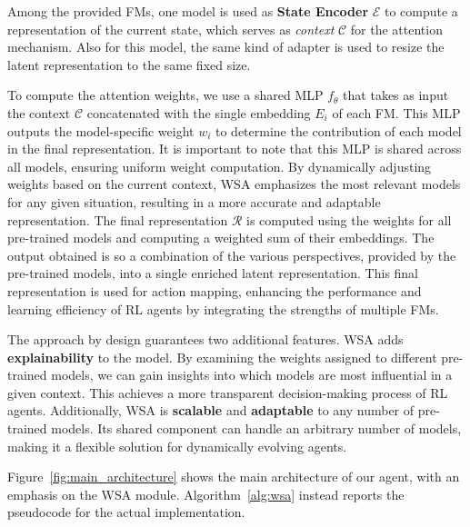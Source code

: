 Among the provided FMs, one model is used as \textbf{State Encoder} $\mathcal{E}$ to compute a representation of the current state, which serves as \textit{context} $\mathcal{C}$ for the attention mechanism.
Also for this model, the same kind of adapter is used to resize the latent representation to the same fixed size.


To compute the attention weights, we use a shared MLP $f_\theta$ that takes as input the context $\mathcal{C}$ concatenated with the single embedding $E_i$ of each FM\@.
This MLP outputs the model-specific weight $w_i$ to determine the contribution of each model in the final representation.
It is important to note that this MLP is shared across all models, ensuring uniform weight computation.
By dynamically adjusting weights based on the current context, WSA emphasizes the most relevant models for any given situation, resulting in a more accurate and adaptable representation.
The final representation $\mathcal{R}$ is computed using the weights for all pre-trained models and computing a weighted sum of their embeddings.
The output obtained is so a combination of the various perspectives, provided by the pre-trained models, into a single enriched latent representation.
This final representation is used for action mapping, enhancing the performance and learning efficiency of RL agents by integrating the strengths of multiple FMs.


The approach by design guarantees two additional features.
WSA adds \textbf{explainability} to the model.
By examining the weights assigned to different pre-trained models, we can gain insights into which models are most influential in a given context.
This achieves a more transparent decision-making process of RL agents.
Additionally, WSA is \textbf{scalable} and \textbf{adaptable} to any number of pre-trained models.
Its shared component can handle an arbitrary number of models, making it a flexible solution for dynamically evolving agents.


Figure~\ref{fig:main_architecture} shows the main architecture of our agent, with an emphasis on the WSA module.
Algorithm~\ref{alg:wsa} instead reports the pseudocode for the actual implementation.

